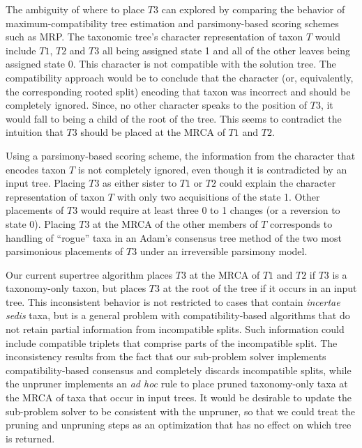 \documentclass[english]{article}
\begin{document}
The ambiguity of where to place $T3$ can explored by comparing the
behavior of maximum-compatibility tree estimation and parsimony-based
scoring schemes such as MRP. The taxonomic tree's character
representation of taxon $T$ would include $T1$, $T2$ and $T3$ 
all being assigned state 1 and all of the other leaves being assigned 
state 0.  This character is not compatible with the solution tree. 
The compatibility approach would be to conclude that the character
(or, equivalently, the corresponding rooted split) encoding that taxon was incorrect and should be completely ignored.
Since, no other character speaks to the position of $T3$, it would
fall to being  a child of the root of the tree.  This seems to
contradict the intuition that $T3$ should be placed at the MRCA of
$T1$ and $T2$.

Using a parsimony-based scoring scheme, the information from the
character that encodes taxon $T$ is not completely ignored, even though it
is contradicted by an input tree.  Placing $T3$ as either sister to
$T1$ or $T2$ could explain the character representation of taxon $T$
with only two acquisitions of the state 1. Other placements of $T3$
would require at least three 0 to 1 changes (or a reversion to state
0). Placing $T3$ at the MRCA of the other members of $T$ corresponds
to handling of ``rogue'' taxa in an Adam's consensus tree
\citep{Adams1972} method of the two  most parsimonious placements of
$T3$ under an irreversible parsimony model. 

Our current supertree algorithm places $T3$ at the MRCA of $T1$ and
$T2$ if $T3$ is a taxonomy-only taxon, but places $T3$ at the root
of the tree if it occurs in an input tree.  This inconsistent behavior
is not restricted to cases that contain \emph{incertae sedis} taxa, but is a
general problem with compatibility-based algorithms that do not retain
partial information from incompatible splits.  Such information could
include compatible triplets that comprise parts of the incompatible split.
The inconsistency results from the fact that our sub-problem solver
implements compatibility-based consensus and completely discards
incompatible splits, while the unpruner implements an \emph{ad hoc}
rule to place pruned taxonomy-only taxa at the MRCA of taxa that occur
in input trees.  It would be desirable to update the sub-problem
solver to be consistent with the unpruner, so that we could treat the
pruning and unpruning steps as an optimization that has no effect on
which tree is returned.
\end{document}
